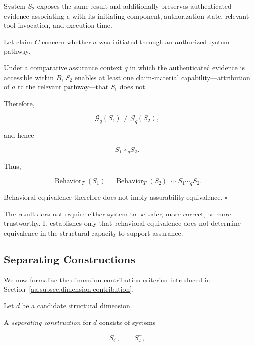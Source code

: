 System \(S_2\) exposes the same result and additionally preserves authenticated evidence associating \(a\) with its initiating component, authorization state, relevant tool invocation, and execution time.

Let claim \(C\) concern whether \(a\) was initiated through an authorized system pathway.

Under a comparative assurance context \(q\) in which the authenticated evidence is accessible within \(B\), \(S_2\) enables at least one claim-material capability---attribution of \(a\) to the relevant pathway---that \(S_1\) does not.

Therefore,

\begin{equation}
  \mathcal{G}_q(S_1)
  \neq
  \mathcal{G}_q(S_2),
\end{equation}

and hence

\begin{equation}
  S_1
  \not\sim_q
  S_2.
\end{equation}

Thus,

\begin{equation}
  \operatorname{Behavior}_T(S_1)
  =
  \operatorname{Behavior}_T(S_2)
  \not\Rightarrow
  S_1\sim_q S_2.
\end{equation}

Behavioral equivalence therefore does not imply assurability equivalence.
\hfill\(\square\)

The result does not require either system to be
safer, more correct, or more trustworthy.
It establishes only that behavioral equivalence does
not determine equivalence in the structural capacity to support assurance.

\subsection{Separating Constructions}
\label{aa.subsec.formal-separations}

We now formalize the dimension-contribution criterion introduced in Section~\ref{aa.subsec.dimension-contribution}.

Let \(d\) be a candidate structural dimension.

A \emph{separating construction} for \(d\) consists of systems

\begin{equation}
  S_d^{-},
  \qquad
  S_d^{+},
\end{equation}

